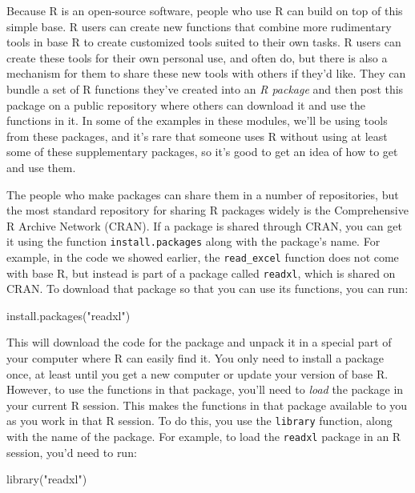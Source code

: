 \documentclass[]{tufte-book}
\newenvironment{Shaded}{}{}
\newcommand{\FunctionTok}[1]{\textcolor[rgb]{0.02,0.16,0.49}{#1}}
\newcommand{\NormalTok}[1]{#1}
\newcommand{\StringTok}[1]{\textcolor[rgb]{0.25,0.44,0.63}{#1}}
\begin{document}
Because R is an open-source software, people who use R can build on top of this
simple base. R users can create new functions that combine more rudimentary
tools in base R to create customized tools suited to their own tasks. R users
can create these tools for their own personal use, and often do, but there is
also a mechanism for them to share these new tools with others if they'd like.
They can bundle a set of R functions they've created into an \emph{R package} and
then post this package on a public repository where others can download it and
use the functions in it. In some of the examples in these modules, we'll be
using tools from these packages, and it's rare that someone uses R without using
at least some of these supplementary packages, so it's good to get an idea of
how to get and use them.

The people who make packages can share them in a number of repositories, but the
most standard repository for sharing R packages widely is the Comprehensive R
Archive Network (CRAN). If a package is shared through CRAN, you can get it
using the function \texttt{install.packages} along with the package's name. For
example, in the code we showed earlier, the \texttt{read\_excel} function does not come
with base R, but instead is part of a package called \texttt{readxl}, which is shared
on CRAN. To download that package so that you can use its functions, you can
run:

\begin{Shaded}
\begin{Highlighting}[]
\FunctionTok{install.packages}\NormalTok{(}\StringTok{"readxl"}\NormalTok{)}
\end{Highlighting}
\end{Shaded}

This will download the code for the package and unpack it in a special part of
your computer where R can easily find it. You only need to install a package
once, at least until you get a new computer or update your version of base R.
However, to use the functions in that package, you'll need to \emph{load} the package
in your current R session. This makes the functions in that package available to
you as you work in that R session. To do this, you use the \texttt{library} function,
along with the name of the package. For example, to load the \texttt{readxl} package in
an R session, you'd need to run:

\begin{Shaded}
\begin{Highlighting}[]
\FunctionTok{library}\NormalTok{(}\StringTok{"readxl"}\NormalTok{)}
\end{Highlighting}
\end{Shaded}
\end{document}
